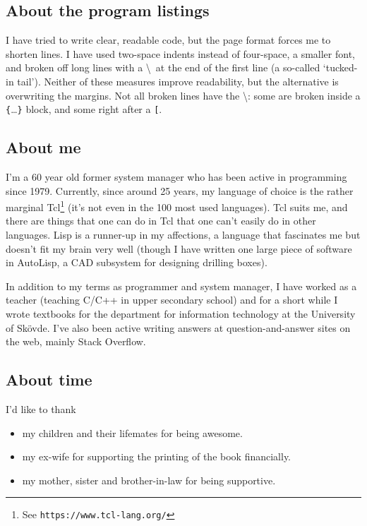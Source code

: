 \documentclass[twoside,9pt]{report}
\begin{document}
\subsection{About the program listings}
\label{about-the-program-listings}

I have tried to write clear, readable code, but the page format forces me to
shorten lines. I have used two-space indents instead of four-space, a smaller
font, and broken off long lines with a \textbackslash\  at the end of the first
line (a so-called `tucked-in tail'). Neither of these measures improve
readability, but the alternative is overwriting the margins. Not all broken
lines have the \textbackslash: some are broken inside a
\texttt{\{}\ldots\texttt{\}} block, and some right after a \texttt{^^5b}.

\subsection{About me}
\label{about-me}

I'm a 60 year old former system manager who has been active in programming
since 1979. Currently, since around 25 years, my language of choice is the
rather marginal Tcl\footnote{See \texttt{https://www.tcl-lang.org/}} (it's not
even in the 100 most used languages). Tcl suits me, and there are things that
one can do in Tcl that one can't easily do in other languages. Lisp is a
runner-up in my affections, a language that fascinates me but doesn't fit my
brain very well (though I have written one large piece of software in AutoLisp,
a CAD subsystem for designing drilling boxes).

In addition to my terms as programmer and system manager, I have worked as a
teacher (teaching C/C++ in upper secondary school) and for a short while I
wrote textbooks for the department for information technology at
the University of Skövde. I've also been active writing answers at
question-and-answer sites on the web, mainly Stack Overflow.

\subsection{About time}
\label{about-time}

I'd like to thank

\begin{itemize}
\item my children and their lifemates for being awesome.

\item my ex-wife for supporting the printing of the book financially.

\item my mother, sister and brother-in-law for being supportive.
\end{itemize}
\end{document}
